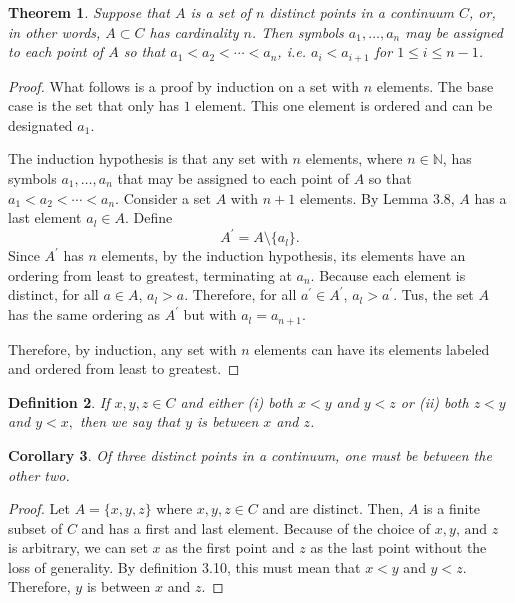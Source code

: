 \documentclass{amsart}
\newtheorem{theorem}{Theorem}
\newtheorem{definition}[theorem]{Definition}
\newtheorem{corollary}[theorem]{Corollary}
\newcommand{\N}{\mathbb N}
\newcommand{\1}{\mathds{1}}
\def \N {{\mathbb {N}}}
\numberwithin{equation}{section}
\numberwithin{theorem}{section}
\begin{document}
\begin{theorem}  Suppose that $A$ is a set of $n$ distinct points in a continuum $C$, or, in other words, $A \subset C$ has cardinality $n$.  Then symbols $a_1, \dotsc, a_n$ may be assigned to each point of $A$ so that $a_1 < a_2 < \dotsm < a_n$, i.e. $a_i < a_{i + 1}$ for $1 \leq i \leq n - 1$.
\end{theorem}

\begin{proof}
	What follows is a proof by induction on a set with $n$ elements. The base case is the set that only has $1$ element. This one element is ordered and can be designated $a_1$. 
	
	The induction hypothesis is that any set with $n$ elements, where $n\in\N$, has symbols $a_1, \dotsc, a_n$ that may be assigned to each point of $A$ so that $a_1 < a_2 < \dotsm < a_n$. Consider a set $A$ with $n+1$ elements. By Lemma 3.8, $A$ has a last element $a_l\in A$. Define $$A^\prime=A\setminus\{a_l\}.$$  Since $A^\prime$ has $n$ elements, by the induction hypothesis, its elements have an ordering from least to greatest, terminating at $a_n$. Because each element is distinct, for all $a\in A$, $a_l>a$. Therefore, for all $a^\prime\in A^\prime$, $a_l>a^\prime$. Tus, the set $A$ has the same ordering as $A^\prime$ but with $a_l = a_{n+1}$. 
	
	Therefore, by induction, any set with $n$ elements can have its elements labeled and ordered from least to greatest.
\end{proof}

\begin{definition}  If $x, y, z \in C$ and either (i) both $x < y$ and $y < z$ or (ii) both $z<y$ and $y<x,$ then we say that $y$ is \emph{between} $x$ and $z$.
\end{definition}

\begin{corollary}  Of three distinct points in a continuum, one must be between the other two.
\end{corollary}

\begin{proof}
	Let $A = \{x,y,z\}$ where $x, y, z \in C$ and are distinct. Then, $A$ is a finite subset of $C$ and has a first and last element. Because of the choice of $x,y\text{, and }z$ is arbitrary, we can set $x$ as the first point and $z$ as the last point without the loss of generality. By definition 3.10, this must mean that $x < y$ and $y < z$. Therefore, $y$ is between $x$ and $z$. 
\end{proof}
\end{document}
